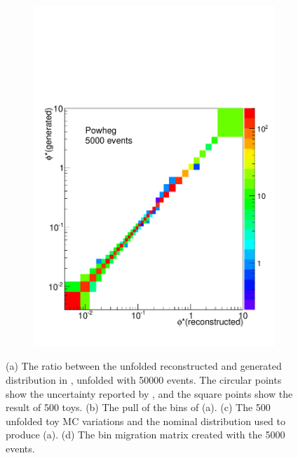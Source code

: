 \begin{figure}[!htbp]
\begin{subfigure}[b]{\SideBySidePlotWidth}
        \includegraphics[width=\textwidth]{figures/BinM_P_5000.pdf}
        \caption{}
        \label{fig:bin_migration_5000}
    \end{subfigure}
    \caption[
        Full uncertainty propegation using \num{5000} \POWHEG events to unfold
        \MADGRAPH.
    ]{
        (a) The ratio between the unfolded reconstructed and generated
        \phistar distribution in \MADGRAPH, unfolded with \num{50000} \POWHEG
        events. The circular points show the uncertainty reported by
        \RooUnfold, and the square points show the result of \num{500} toys.
        (b) The pull of the bins of (a). (c) The \num{500} unfolded toy MC
        variations and the nominal distribution used to produce (a). (d) The
        bin migration matrix created with the \num{5000} \POWHEG events.
    }
\label{fig:5000_propegation_unfolding}
\end{figure}

